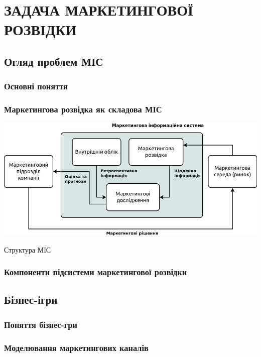 ﻿\section{ЗАДАЧА МАРКЕТИНГОВОЇ РОЗВІДКИ}
%
\subsection{Огляд проблем МІС}
\subsubsection{Основні поняття}
\subsubsection{Маркетингова розвідка як складова МІС}
\begin{stdfigure}
\includegraphics[width=7in]{images/mis_structure.png}
\caption{Структура МІС}
\label{fig:mis_structure}
\end{stdfigure}    

\subsubsection{Компоненти підсистеми маркетингової розвідки}

\subsection{Бізнес-ігри}
\subsubsection{Поняття бізнес-гри}

\subsubsection{Моделювання маркетингових каналів}

